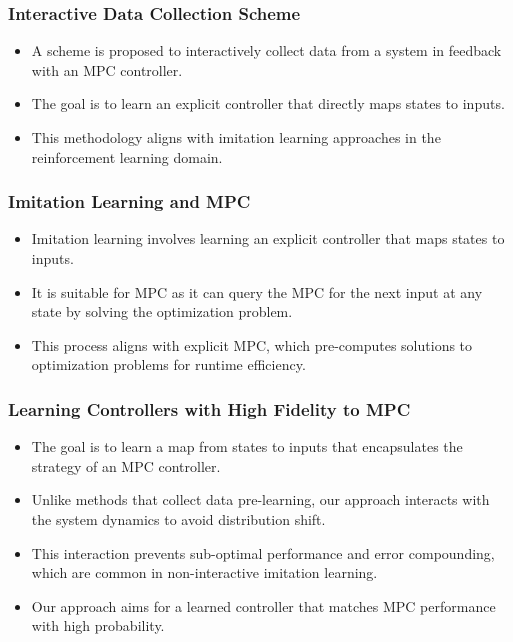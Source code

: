 \documentclass[aspectratio=169,hyperref={pdfpagelabels=false}]{beamer}
\begin{document}
    \begin{frame}
      \frametitle{Interactive Data Collection Scheme}
      \begin{itemize}
          \item A scheme is proposed to interactively collect data from a system in feedback with an MPC controller.
          \item The goal is to learn an explicit controller that directly maps states to inputs.
          \item This methodology aligns with imitation learning approaches in the reinforcement learning domain.
      \end{itemize}
      \vfill
      \let\thefootnote\relax{}
    \end{frame}
      

      \begin{frame}
        \frametitle{Imitation Learning and MPC}
        \begin{itemize}
            \item Imitation learning involves learning an explicit controller that maps states to inputs.
            \item It is suitable for MPC as it can query the MPC for the next input at any state by solving the optimization problem.
            \item This process aligns with explicit MPC, which pre-computes solutions to optimization problems for runtime efficiency.
        \end{itemize}
      \let\thefootnote\relax{}
        \end{frame}

        \begin{frame}
          \frametitle{Learning Controllers with High Fidelity to MPC}
          \begin{itemize}
              \item The goal is to learn a map from states to inputs that encapsulates the strategy of an MPC controller.
              \item Unlike methods that collect data pre-learning, our approach interacts with the system dynamics to avoid distribution shift.
              \item This interaction prevents sub-optimal performance and error compounding, which are common in non-interactive imitation learning.
              \item Our approach aims for a learned controller that matches MPC performance with high probability.
          \end{itemize}
      \let\thefootnote\relax{}
          \end{frame}
          
\end{document}
